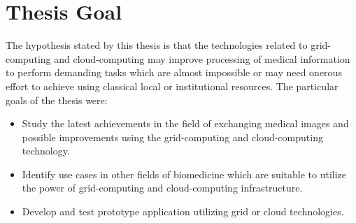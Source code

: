 \section{Thesis Goal}
\label{sec:goal}
The hypothesis stated by this thesis is that the technologies related to grid-computing and cloud-computing may improve processing of medical information to perform demanding tasks which are almost impossible or may need onerous effort to achieve using classical local or institutional resources.
The particular goals of the thesis were:
\begin{itemize}
\item Study the latest achievements in the field of exchanging medical images and  possible improvements using the grid-computing and cloud-computing technology.
\item Identify use cases in other fields of biomedicine which are suitable to utilize the power of grid-computing and cloud-computing infrastructure.
\item Develop and test prototype application utilizing grid or cloud technologies.
\end{itemize}
 
